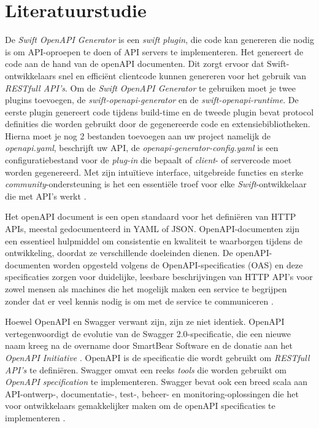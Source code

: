\section{Literatuurstudie}%
\label{sec:literatuurstudie}
De \textit{Swift OpenAPI Generator} is een \textit{swift plugin}, die code kan genereren die nodig is om API-oproepen te doen of API servers te implementeren. Het genereert de code aan de hand van de openAPI documenten. Dit zorgt ervoor dat Swift-ontwikkelaars snel en efficiënt clientcode kunnen genereren voor het gebruik van \textit{RESTfull API’s}. Om de \textit{Swift OpenAPI Generator} te gebruiken moet je twee plugins toevoegen, de \textit{swift-openapi-generator} en de \textit{swift-openapi-runtime}. De eerste plugin genereert code tijdens build-time en de tweede plugin bevat protocol definities die worden gebruikt door de gegenereerde code en extensiebibliotheken. Hierna moet je nog 2 bestanden toevoegen aan uw project namelijk de \textit{openapi.yaml}, beschrijft uw API, de \textit{openapi-generator-config.yaml} is een configuratiebestand voor de \textit{plug-in} die bepaalt of \textit{client}- of servercode moet worden gegenereerd. Met zijn intuïtieve interface, uitgebreide functies en sterke \textit{community}-ondersteuning is het een essentiële troef voor elke \textit{Swift}-ontwikkelaar die met API's werkt  \autocite{Dvorsky2023} . 

Het openAPI document is een open standaard voor het definiëren van HTTP APIs, meestal gedocumenteerd in YAML of JSON. OpenAPI-documenten zijn een essentieel hulpmiddel om consistentie en kwaliteit te waarborgen tijdens de ontwikkeling, doordat ze verschillende doeleinden dienen. De openAPI-documenten worden opgesteld volgens de OpenAPI-specificaties (OAS) en deze specificaties zorgen voor duidelijke, leesbare beschrijvingen van HTTP API’s voor zowel mensen als machines die het mogelijk maken een service te begrijpen zonder dat er veel kennis nodig is om met de service te communiceren \autocite{Miller2020}. 

Hoewel OpenAPI en Swagger verwant zijn, zijn ze niet identiek. OpenAPI vertegenwoordigt de evolutie van de Swagger 2.0-specificatie, die een nieuwe naam kreeg na de overname door SmartBear Software en de donatie aan het \textit{OpenAPI Initiative} \autocite{2023}. OpenAPI is de specificatie die wordt gebruikt om \textit{RESTfull API's} te definiëren. Swagger omvat een reeks \textit{tools} die worden gebruikt om \textit{OpenAPI specification} te implementeren. Swagger bevat ook een breed scala aan API-ontwerp-, documentatie-, test-, beheer- en monitoring-oplossingen die het voor ontwikkelaars gemakkelijker maken om de openAPI specificaties te implementeren \autocite{ Pinkham2017}. 

